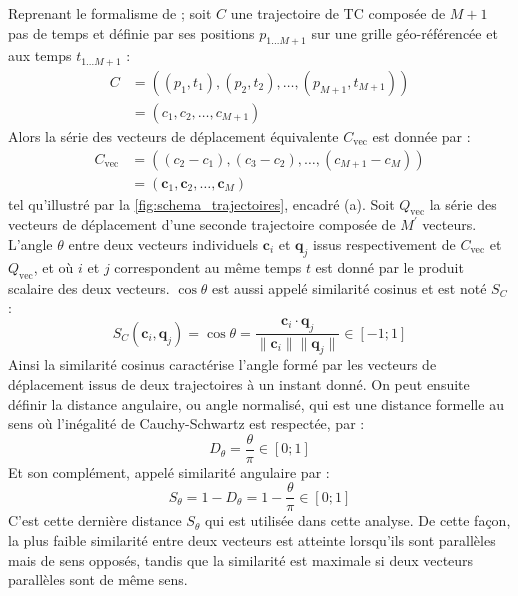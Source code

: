 \documentclass[../main.tex]{subfiles}
\begin{document}
Reprenant le formalisme de \cite{nakamura_shapebased_2013} ; soit $C$ une trajectoire de TC composée de $M+1$ pas de temps et définie par ses positions
$p_{1...M+1}$ sur une grille géo-référencée et aux temps $t_{1...M+1}$ :
%
\begin{align*}
    C &= ((p_1, t_1), (p_2, t_2), \ldots, (p_{M+1}, t_{M+1}))\\
      &= (c_1, c_2, \ldots, c_{M+1})
\end{align*}
%
Alors la série des vecteurs de déplacement équivalente $C_{\text{vec}}$ est donnée par :
\begin{align*}
    C_{\text{vec}} &= ((c_2 - c_1), (c_3 - c_2), \ldots, (c_{M+1} - c_M))\\
            &= (\mathbf{c}_1, \mathbf{c}_2, \ldots, \mathbf{c}_M)
\end{align*}
%
tel qu'illustré par la \cref{fig:schema_trajectoires}, encadré (a). Soit $Q_{\text{vec}}$ la série des vecteurs de déplacement d'une seconde trajectoire composée de
$M^\prime$ vecteurs. L'angle $\theta$ entre deux vecteurs individuels $\mathbf{c}_i$ et $\mathbf{q}_j$ issus respectivement de $C_{\text{vec}}$ et
$Q_{\text{vec}}$, et où $i$ et $j$ correspondent au même temps $t$ est donné par le produit scalaire des deux vecteurs. $\cos \theta$ est aussi appelé
similarité cosinus et est noté $S_C$ :
%
\begin{equation*}
    S_C(\mathbf{c}_i, \mathbf{q}_j) = \cos \theta = \frac{\mathbf{c}_i \cdot \mathbf{q}_j}{\lVert \mathbf{c}_i \rVert \lVert \mathbf{q}_j \rVert} \in [-1; 1] 
\end{equation*}
%
Ainsi la similarité cosinus caractérise l'angle formé par les vecteurs de déplacement issus de deux trajectoires à un instant donné. On peut ensuite définir la
distance angulaire, ou angle normalisé, qui est une distance formelle au sens où l'inégalité de Cauchy-Schwartz est respectée, par :
%
\begin{equation*}
    D_\theta = \frac{\theta}{\pi} \in [0; 1]
\end{equation*}
%
Et son complément, appelé similarité angulaire par :
%
\begin{equation*}
    S_\theta = 1 - D_\theta = 1 - \frac{\theta}{\pi} \in [0; 1]
\end{equation*}
%
C'est cette dernière distance $S_\theta$ qui est utilisée dans cette analyse. De cette façon, la plus faible similarité entre deux vecteurs est atteinte
lorsqu'ils sont parallèles mais de sens opposés, tandis que la similarité est maximale si deux vecteurs parallèles sont de même sens.
\end{document}
